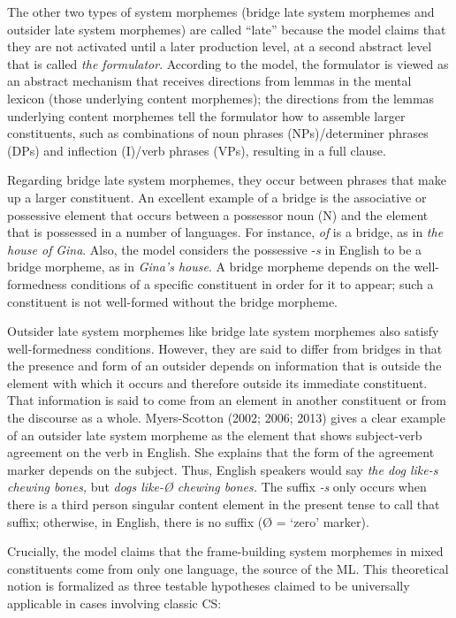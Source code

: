 \documentclass[output=paper]{langsci/langscibook}
\begin{document}
The other two types of system morphemes (bridge late system morphemes and outsider late system morphemes) are called “late” because the model claims that they are not activated until a later production level, at a second abstract level that is called \textit{the formulator}. According to the model, the formulator is viewed as an abstract mechanism that receives directions from lemmas in the mental lexicon (those underlying content morphemes); the directions from the lemmas underlying content morphemes tell the formulator how to assemble larger constituents, such as combinations of noun phrases (NPs)/determiner phrases (DPs) and inflection (I)/verb phrases (VPs), resulting in a full clause. 

Regarding bridge late system morphemes, they occur between phrases that make up a larger constituent. An excellent example of a bridge is the associative or possessive element that occurs between a possessor noun (N) and the element that is possessed in a number of languages. For instance, \textit{of }is a bridge, as in \textit{the house of}\textbf{\textit{ }}\textit{Gina}. Also, the model considers the possessive -\textit{s }in English to be a bridge morpheme, as in \textit{Gina’s house}. A bridge morpheme depends on the well-formedness conditions of a specific constituent in order for it to appear; such a constituent is not well-formed without the bridge morpheme. 

Outsider late system morphemes like bridge late system morphemes also satisfy well-formedness conditions. However, they are said to differ from bridges in that the presence and form of an outsider depends on information that is outside the element with which it occurs and therefore outside its immediate constituent. That information is said to come from an element in another constituent or from the discourse as a whole. Myers-Scotton (2002; 2006; 2013) gives a clear example of an outsider late system morpheme as the element that shows subject-verb agreement on the verb in English. She explains that the form of the agreement marker depends on the subject. Thus, English speakers would say \textit{the dog like-s chewing bones, }but \textit{dogs like-Ø chewing bones. }The suffix \textit{{}-s} only occurs when there is a third person singular content element in the present tense to call that suffix; otherwise, in English, there is no suffix (Ø = ‘zero’ marker).

Crucially, the model claims that the frame-building system morphemes in mixed constituents come from only one language, the source of the ML. This theoretical notion is formalized as three testable hypotheses claimed to be universally applicable in cases involving classic CS:
\end{document}
